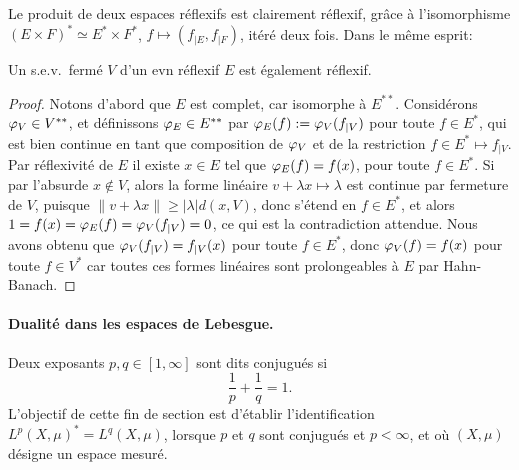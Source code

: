 Le produit de deux espaces réflexifs est clairement réflexif, grâce à l'isomorphisme $(E \times F)^* \simeq E^* \times F^*$, $f \mapsto (f_{|E}, f_{|F})$, itéré deux fois. Dans le même esprit:
\begin{proposition}
\label{prop:reflex_sev}
%
	Un s.e.v.\ fermé $V$ d'un evn réflexif $E$ est également réflexif.
\end{proposition}

\begin{proof}
	Notons d'abord que $E$ est complet, car isomorphe à $E^{**}$.
	Considérons $\varphi_V \in V^{**}$, et définissons $\varphi_E \in E^{**}$ par $\varphi_E(f) := \varphi_V(f_{|V})$ pour toute $f \in E^*$, qui est bien continue en tant que composition de $\varphi_V$ et de la restriction $f\in E^*\mapsto f_{|V}$. Par réflexivité de $E$ il existe $x\in E$ tel que $\varphi_E(f) = f(x)$, pour toute $f \in E^*$. 
	Si par l'absurde $x \notin V$, alors la forme linéaire $v+\lambda x \mapsto \lambda$ est continue par fermeture de $V$, puisque $\|v+\lambda x\| \geq |\lambda| d(x,V)$, donc s'étend en $f \in E^*$, et alors $1 = f(x) = \varphi_E(f) = \varphi_V(f_{|V}) = 0$, ce qui est la contradiction attendue. Nous avons obtenu que $\varphi_V(f_{|V}) = f_{|V}(x)$ pour toute $f \in E^*$, donc $\varphi_V(f) = f(x)$ pour toute $f \in V^*$ car toutes ces formes linéaires sont prolongeables à $E$ par Hahn-Banach.	
\end{proof}


\paragraph{Dualité dans les espaces de Lebesgue.}
Deux exposants $p,q \in [1,\infty]$ sont dits conjugués si 
\begin{equation*}
	\frac 1 p + \frac 1 q = 1.
\end{equation*}
L'objectif de cette fin de section est d'établir l'identification $L^p(X,\mu)^* = L^q(X,\mu)$, lorsque $p$ et $q$ sont conjugués et $p<\infty$, et où $(X,\mu)$ désigne un espace mesuré. 

